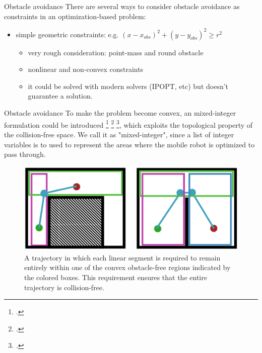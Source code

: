 \documentclass{beamer}
\begin{document}
\begin{frame}{Obstacle avoidance}
	There are several ways to consider obstacle avoidance as constraints in an optimization-based problem:
	\begin{itemize}
		\item simple geometric constraints: e.g. $(x - x_{obs})^2 + (y - y_{obs})^2 \geq r^2 $
		\begin{itemize}
			\item very rough consideration: point-mass and round obstacle
			\item nonlinear and non-convex constraints
			\item it could be solved with modern solvers (IPOPT, etc) but doesn't guarantee a solution. 
		\end{itemize}
	\end{itemize}
\end{frame}

\begin{frame}{Obstacle avoidance}
	To make the problem become convex, an mixed-integer formulation could be introduced \footcite{richards2002aircraft} \footcite{deits2014footstep} \footcite{deits2015efficient}, which exploits the topological property of the collision-free space. We call it as "mixed-integer", since a list of integer variables is to used to represent the areas where the mobile robot is optimized to pass through. 
	\begin{figure}
		\includegraphics[width=0.5\linewidth]{figures/collision-free-mixed-integer.png}
		\caption{A trajectory in which each linear segment is required to remain entirely within one of the convex obstacle-free regions indicated by the colored boxes. This requirement ensures that the entire trajectory is collision-free.}
	\end{figure}
\end{frame}
\end{document}
